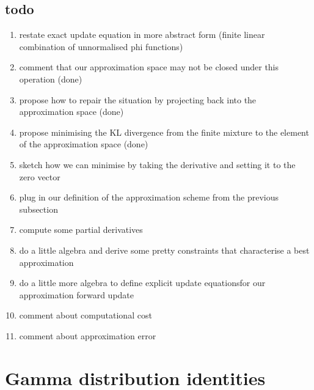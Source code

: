 \documentclass[twoside, 11pt]{article}
\begin{document}
\subsection{todo}

\begin{enumerate}
\item restate exact update equation in more abstract form (finite linear combination of unnormalised phi functions)
\item comment that our approximation space may not be closed under this operation (done)
\item propose how to repair the situation by projecting back into the approximation space (done)
\item propose minimising the KL divergence from the finite mixture to the element of the approximation space (done)
\item sketch how we can minimise by taking the derivative and setting it to the zero vector
\item plug in our definition of the approximation scheme from the previous subsection
\item compute some partial derivatives
\item do a little algebra and derive some pretty constraints that characterise a best approximation
\item do a little more algebra to define explicit update equationsfor our approximation forward update
\item comment about computational cost
\item comment about approximation error
\end{enumerate}

\appendix

\section{Gamma distribution identities}
\label{appendix:gammaconj}
\end{document}
